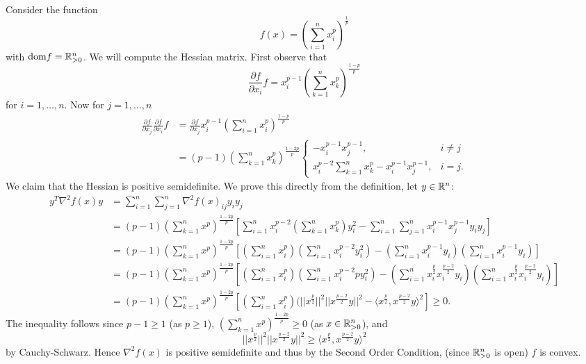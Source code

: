 \documentclass[letterpaper,12pt,oneside,onecolumn]{article}
\begin{document}
\paragraph{}
Consider the function
$$f(x) = (\sum_{i=1}^n x_i^p)^\frac{1}{p}$$
with $\text{dom} f = \mathbb{R}^n_{>0}$. We will compute the Hessian matrix. First observe that
$$\frac{\partial f}{\partial x_i} f = x_i^{p-1}(\sum_{k=1}^n x_k^p)^\frac{1-p}{p}$$
for $i = 1, \dots, n$. Now for $j = 1, \dots, n$
\begin{align*}
\frac{\partial f}{\partial x_j}\frac{\partial f}{\partial x_i} f &= \frac{\partial f}{\partial x_j}   x_i^{p-1}(\sum_{i=1}^n x_i^p)^\frac{1-p}{p} \\
&=(p-1)(\sum_{k=1}^n x_k^p)^\frac{1-2p}{p}\begin{cases}
-x_i^{p-1}x_j^{p-1}, &i\neq j \\
x_i^{p-2}\sum_{k=1}^n x_k^p  -x_i^{p-1}x_j^{p-1}, &i=j.
\end{cases}
\end{align*}
We claim that the Hessian is positive semidefinite. We prove this directly from the definition, let $y \in \mathbb{R}^n$:
\begin{align*}
y^T\nabla^2f(x)y &= \sum_{i=1}^n \sum_{j=1}^n \nabla^2f(x)_{ij} y_i y_j \\
&= (p-1) (\sum_{k=1}^nx^p)^\frac{1-2p}{p}[\sum_{i=1}^nx_i^{p-2}(\sum_{k=1}^nx_k^p)y_i^2 - \sum_{i=1}^n\sum_{j=1}^n x_i^{p-1}x_j^{p-1}y_i y_j ] \\
&= (p-1) (\sum_{k=1}^nx^p)^\frac{1-2p}{p}[(\sum_{i=1}^nx_i^{p})(\sum_{i=1}^nx_i^{p-2}y_i^2) - (\sum_{i=1}^n x_i^{p-1}y_i)(\sum_{i=1}^n x_i^{p-1} y_i) ] \\
&= (p-1) (\sum_{k=1}^nx^p)^\frac{1-2p}{p}[(\sum_{i=1}^nx_i^{p})(\sum_{i=1}^nx_i^{p-2}py_i^2) - (\sum_{i=1}^n x_i^\frac{p}{2}x_i^\frac{p-2}{2}y_i)(\sum_{i=1}^n x_i^\frac{p}{2}x_i^\frac{p-2}{2}y_i)]\\
&= (p-1) (\sum_{k=1}^nx^p)^\frac{1-2p}{p}[(\sum_{i=1}^nx_i^{p})(||x^\frac{p}{2}||^2||x^\frac{p-2}{2}y||^2 - \langle x^\frac{p}{2}, x^\frac{p-2}{2}y\rangle^2]
\geq 0.
\end{align*}
The inequality follows since $p-1 \geq 1$ (as $p \geq 1$), $(\sum_{k=1}^nx^p)^\frac{1-2p}{p} \geq 0$ (as $x \in \mathbb{R}^n_{>0}$), and 
$$||x^\frac{p}{2}||^2||x^\frac{p-2}{2}y||^2 \geq \langle x^\frac{p}{2}, x^\frac{p-2}{2}y\rangle^2$$
by Cauchy-Schwarz. Hence $\nabla^2f(x)$ is positive semidefinite and thus by the Second Order Condition, (since $\mathbb{R}^n_{>0}$ is open) $f$ is convex.
\end{document}
